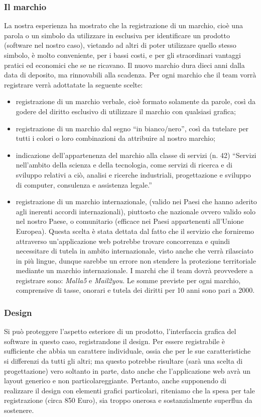 \subsubsection{Il marchio}
La nostra esperienza ha mostrato che la registrazione di un marchio, cioè una parola o un simbolo da utilizzare in esclusiva per identificare un prodotto (software nel nostro caso), vietando ad altri di poter utilizzare quello stesso simbolo, è molto conveniente, per i bassi costi, e per gli straordinari vantaggi pratici ed economici che se ne ricavano. Il nuovo marchio dura dieci anni dalla data di deposito, ma rinnovabili alla scadenza. Per ogni marchio che il team vorrà registrare verrà adottatate la seguente scelte:
\begin{itemize}
\item registrazione di un marchio verbale, cioè formato solamente da parole, così da godere del diritto esclusivo di utilizzare il marchio con qualsiasi grafica;
\item registrazione di un marchio dal segno ``in bianco/nero'', così da tutelare per tutti i colori o loro combinazioni da attribuire al nostro marchio;
\item indicazione dell'appartenenza del marchio alla classe di servizi (n. 42) ``Servizi nell'ambito della scienza e della tecnologia, come servizi di ricerca e di sviluppo relativi a ciò, analisi e ricerche industriali, progettazione e sviluppo di computer, consulenza e assistenza legale.''
\item registrazione di un marchio internazionale, (valido nei Paesi che hanno aderito agli inerenti accordi internazionali), piuttosto che nazionale ovvero valido solo nel nostro Paese, o  comunitario (efficace nei Paesi appartenenti all'Unione Europea). Questa scelta è stata dettata dal fatto che il servizio che forniremo attraverso un'applicazione web potrebbe trovare concorrenza e quindi necessitare di tutela in ambito internazionale, visto anche che verrà rilasciato in più lingue, dunque sarebbe un errore non stendere la protezione territoriale mediante un marchio internazionale.
I marchi che il team dovrà provvedere a registrare sono: \textit{Malla5} e \textit{Mail2you}. Le somme previste per ogni marchio, comprensive di tasse, onorari e tutela dei diritti per 10 anni sono pari a 2000\officialeuro.
\end{itemize}

\subsubsection{Design}
Si può proteggere l'aspetto esteriore di un prodotto, l'interfaccia grafica del software in questo caso, registrandone il design. Per essere registrabile è sufficiente che abbia un carattere individuale, ossia che per le sue caratteristiche si differenzi da tutti gli altri; ma questo potrebbe risultare (sarà una scelta di progettazione) vero soltanto in parte, dato anche che l'applicazione web avrà un layout generico e non particolareggiante. Pertanto, anche supponendo di realizzare il design con elementi grafici particolari, riteniamo che la spesa per tale registrazione (circa 850 Euro), sia troppo onerosa e sostanzialmente superflua da sostenere.


